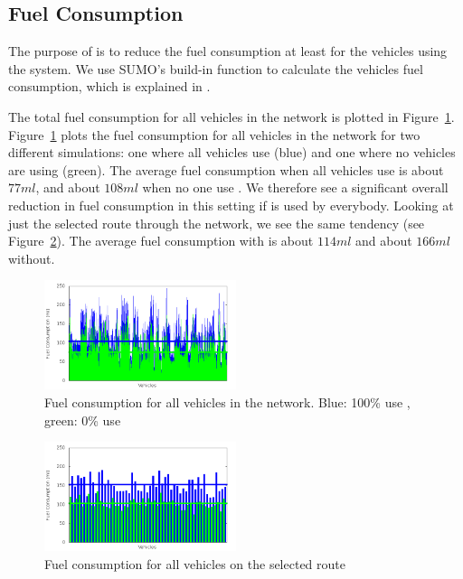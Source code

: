 %
%
%
\subsection{Fuel Consumption}
The purpose of \tech is to reduce the fuel consumption at least for the vehicles using the system. 
We use SUMO's build-in function to calculate the vehicles fuel consumption, which is explained in \cite{SUMOFuel}.

The total fuel consumption for all vehicles in the network is plotted in Figure~\ref{fig:TestResults:fuelTotal}.
Figure~\ref{fig:TestResults:fuelTotal} plots the fuel consumption for all vehicles in the network for two different simulations: one where all vehicles use \tech (blue) and one where no vehicles are using \tech (green).
The average fuel consumption when all vehicles use \tech is about $77 ml$, and about $108 ml$ when no one use \tech.
We therefore see a significant overall reduction in fuel consumption in this setting if \tech is used by everybody.
Looking at just the selected route through the network, we see the same tendency (see Figure~\ref{fig:TestResults:fuelRoute}). 
The average fuel consumption with \tech is about $114 ml$ and about $166 ml$ without. 
\begin{figure}[h]
\includegraphics[width=0.5\textwidth]{images/tp0/fuelTotal.png}
\caption{Fuel consumption for all vehicles in the network. Blue: 100\% use \tech, green: 0\% use \tech}
\label{fig:TestResults:fuelTotal}
\end{figure}
\begin{figure}[h]
\includegraphics[width=0.5\textwidth]{images/tp0/fuelRoute.png}
\caption{Fuel consumption for all vehicles on the selected route}
\label{fig:TestResults:fuelRoute}
\end{figure}

